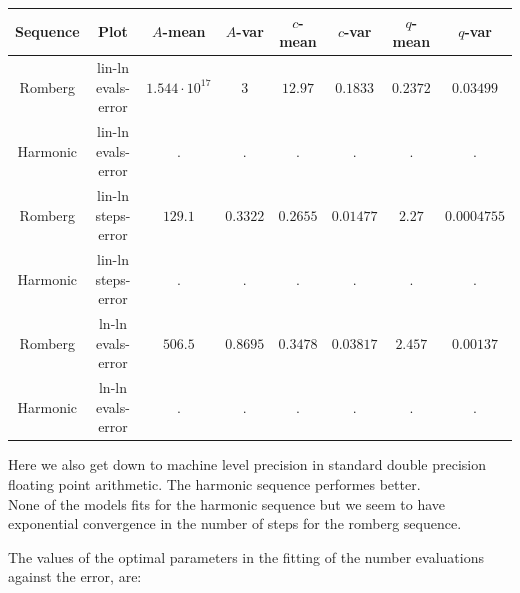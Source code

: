 \begin{table}[H]
    \centering
    \small
    \begin{tabular}{c|c||c|c|c|c|c|c}
Sequence & Plot & \(A\)-mean & \(A\)-var & \(c\)-mean & \(c\)-var & \(q\)-mean & \(q\)-var\\\hline
Romberg & lin-ln evals-error & \(1.544\cdot 10^{17}\) & \(3\) & \(12.97\) & \(0.1833\) & \(0.2372\) & \(0.03499\) \\
Harmonic & lin-ln evals-error & . & . & . & . & . & . \\
Romberg & lin-ln steps-error & \(129.1\) & \(0.3322\) & \(0.2655\) & \(0.01477\) & \(2.27\) & \(0.0004755\) \\
Harmonic & lin-ln steps-error & . & . & . & . & . & . \\
Romberg & ln-ln evals-error & \(506.5\) & \(0.8695\) & \(0.3478\) & \(0.03817\) & \(2.457\) & \(0.00137\) \\
Harmonic & ln-ln evals-error & . & . & . & . & . & . \\
    \end{tabular}
    \label{tab:my_label}
\end{table}


Here we also get down to machine level precision in standard double precision floating point arithmetic. The harmonic sequence performes better.\\

None of the models fits for the harmonic sequence but we seem to have exponential convergence in the number of steps for the romberg sequence.

The values of the optimal parameters in the fitting of the number evaluations against the error, are:


